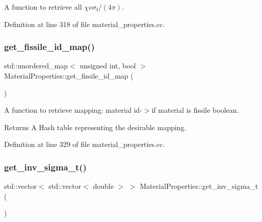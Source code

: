 A function to retrieve all $\chi\nu\sigma_\mathrm{f}/(4\pi)$. 



Definition at line 318 of file material\+\_\+properties.\+cc.

\mbox{\label{class_material_properties_ae04d6676e685d374cb82a15a6b45d96b}} 
\subsubsection{\texorpdfstring{get\+\_\+fissile\+\_\+id\+\_\+map()}{get\_fissile\_id\_map()}}
{\footnotesize\ttfamily std\+::unordered\+\_\+map$<$ unsigned int, bool $>$ Material\+Properties\+::get\+\_\+fissile\+\_\+id\+\_\+map (\begin{DoxyParamCaption}{ }\end{DoxyParamCaption})}

A function to retrieve mapping\+: material id-\/$>$if material is fissile boolean.

\begin{DoxyReturn}{Returns}
A Hash table representing the desirable mapping. 
\end{DoxyReturn}


Definition at line 329 of file material\+\_\+properties.\+cc.

\mbox{\label{class_material_properties_a319b2dd1caaa13cc9b1afc9ace17e218}} 
\subsubsection{\texorpdfstring{get\+\_\+inv\+\_\+sigma\+\_\+t()}{get\_inv\_sigma\_t()}}
{\footnotesize\ttfamily std\+::vector$<$ std\+::vector$<$ double $>$ $>$ Material\+Properties\+::get\+\_\+inv\+\_\+sigma\+\_\+t (\begin{DoxyParamCaption}{ }\end{DoxyParamCaption})}



